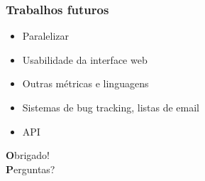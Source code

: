 \documentclass[brazil]{beamer}
\begin{document}
	\begin{frame}
		\frametitle{Trabalhos futuros}
		\begin{itemize}
			\item Paralelizar
			\item Usabilidade da interface web
			\item Outras métricas e linguagens
			\item Sistemas de bug tracking, listas de email
			\item API
		\end{itemize}
	\end{frame}

	\begin{frame}
		\centering \Huge \textbf Obrigado!\\ \vspace{0.5cm}
		\centering \huge \textbf Perguntas?\\
	\end{frame}





\end{document}
